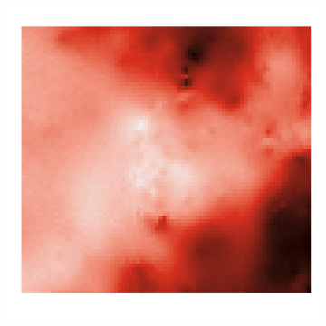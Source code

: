 \documentclass{article}
\begin{document}
\begin{figure}
\begin{subfigure}{0.3\textwidth}
 		\includegraphics[width=\linewidth]{figures/p_real5}\\
 	\end{subfigure}
 	\begin{subfigure}{0.08\textwidth}

\end{subfigure}
\end{figure}
\end{document}
